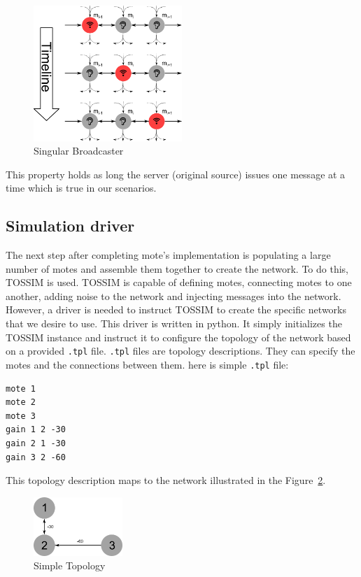 \documentclass[11pt, titlepage, oneside]{article}
\begin{document}
\begin{figure}[h] 
  \centering 
      \includegraphics[width=0.5\textwidth]{com_scheme.png} 
  \caption{Singular Broadcaster} 
\label{fig:comchm} 
\end{figure} 
 
This property holds as long the server (original source) issues one message at a time which is true in our scenarios. 
 
 
 
\subsection{Simulation driver} \label{smldrv}
The next step after completing mote's implementation is populating a large number of motes and assemble them together to create the network. To do this, TOSSIM is used. TOSSIM is capable of defining motes, connecting motes to one another, adding noise to the network and injecting messages into the network. However, a driver is needed to instruct TOSSIM to create the specific networks that we desire to use. This driver is written in python. It simply initializes the TOSSIM instance and instruct it to configure the topology of the network based on a provided {\tt *.tpl} file. {\tt *.tpl} files are topology descriptions. They can specify the motes and the connections between them. here is simple {\tt *.tpl} file: 
 
 
\begin{lstlisting}[label=some-code,caption=Sample .tpl File] 
mote 1 
mote 2 
mote 3 
gain 1 2 -30 
gain 2 1 -30 
gain 3 2 -60 
\end{lstlisting} 
 
This topology description maps to the network illustrated in the Figure~\ref{fig:smptpl}. 
 
\begin{figure}[h] 
  \centering 
      \includegraphics[width=0.3\textwidth]{simple_topo.png} 
  \caption{Simple Topology} 
\label{fig:smptpl} 
\end{figure} 
 
\end{document}

